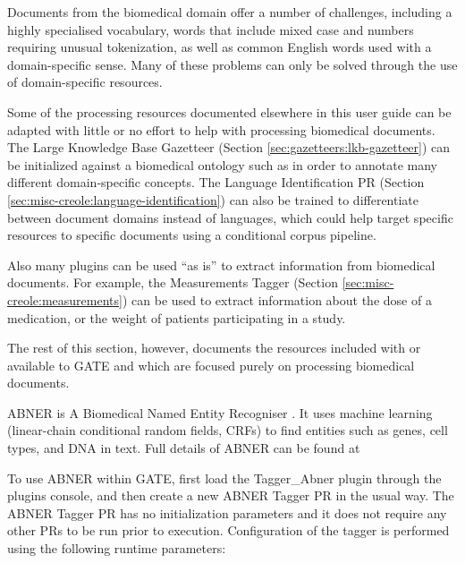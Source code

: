 
Documents from the biomedical domain offer a number of challenges, including a highly
specialised vocabulary, words that include mixed case and numbers requiring unusual
tokenization, as well as common English words used with a domain-specific sense.
Many of these problems can only be solved through the use of domain-specific resources.

Some of the processing resources documented elsewhere in this user guide can be
adapted with little or no effort to help with processing biomedical documents.
The Large Knowledge Base Gazetteer (Section \ref{sec:gazetteers:lkb-gazetteer}) can be initialized
against a biomedical ontology such as  in order
to annotate many different domain-specific concepts. The Language Identification PR
(Section \ref{sec:misc-creole:language-identification}) can also be trained to differentiate between
document domains instead of languages, which could help target specific resources to specific documents
using a conditional corpus pipeline.

Also many plugins can be used ``as is'' to extract information from
biomedical documents. For example, the Measurements Tagger (Section \ref{sec:misc-creole:measurements})
can be used to extract information about the dose of a medication, or the weight of patients participating in a study.

The rest of this section, however, documents the resources included with or available to GATE and which are
focused purely on processing biomedical documents.


ABNER is A Biomedical Named Entity Recogniser \cite{Settles05}. It uses machine learning
(linear-chain conditional random fields, CRFs) to find entities such as
genes, cell types, and DNA in text. Full details of ABNER can be found at

To use ABNER within GATE, first load the Tagger\_Abner plugin through the plugins console,
and then create a new ABNER Tagger PR in the usual way. The ABNER Tagger PR has no
initialization parameters and it does not require any other PRs to be run
prior to execution. Configuration of the tagger is performed using the following
runtime parameters:

